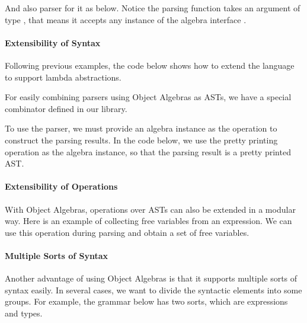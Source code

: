 And also parser for it as below. Notice the parsing function  takes an argument of type , that means it accepts any instance of the algebra interface .


\paragraph{Extensibility of Syntax} Following previous examples, the code below shows how to extend the language to support lambda abstractions.


For easily combining parsers using Object Algebras as ASTs, we have a special combinator  defined in our library.

To use the parser, we must provide an algebra instance as the operation to construct the parsing results. In the code below, we use the pretty printing operation  as the algebra instance, so that the parsing result is a pretty printed AST.


\paragraph{Extensibility of Operations} With Object Algebras, operations over ASTs can also be extended in a modular way. Here is an example of collecting free variables from an expression. We can use this operation during parsing and obtain a set of free variables.



\paragraph{Multiple Sorts of Syntax} Another advantage of using Object Algebras is that it supports multiple sorts of syntax easily. In several cases, we want to divide the syntactic elements into some groups. For example, the grammar below has two sorts, which are expressions and types.


